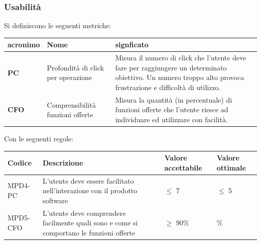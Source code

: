 \subsubsection{Usabilità}
\par Si definiscono le seguenti metriche:
\begin{table}[h!]
\centering
\def\arraystretch{1.5}
\begin{tabular}{ |m{2cm}|m{5.5cm}|m{6.5cm}| }
\hline
\rowcolor{lightgray!30}
\textbf{acronimo} & \textbf{Nome} & \textbf{signficato}\\
\hline
\textbf{PC} & Profondità di click per operazione & Misura il numero di click che l'utente deve fare per raggiungere un determinato obiettivo. Un numero troppo alto provoca frustrazione e difficoltà di utilizzo.\\
\hline
\textbf{CFO} & Comprensibilità funzioni offerte & Misura la quantità (in percentuale) di funzioni offerte che l'utente riesce ad individuare ed utilizzare con facilità.\\
\hline
\end{tabular}
\end{table}
\newpage
\par Con le seguenti regole:
\begin{table}[h!]
\centering
\def\arraystretch{1.5}
\begin{tabular}{ |>{\centering\arraybackslash}m{2.5cm}|>{\centering\arraybackslash}m{5.5cm}|>{\centering\arraybackslash}m{3cm}|>{\centering\arraybackslash}m{3cm}| }
\hline
\rowcolor{black}
\textbf{\color{white} Codice} & \textbf{\color{white} Descrizione} & \textbf{\color{white} Valore accettabile} & \textbf{\color{white} Valore ottimale}\\
\hline
MPD4-PC & L'utente deve essere facilitato nell'interazione con il prodotto software & $\leq$ 7 & $\leq$ 5 \\
\hline
MPD5-CFO & L'utente deve comprendere facilmente quali sono e come si comportano le funzioni offerte & $\geq$ 90\% & 100\% \\
\hline
\end{tabular}
\end{table}

